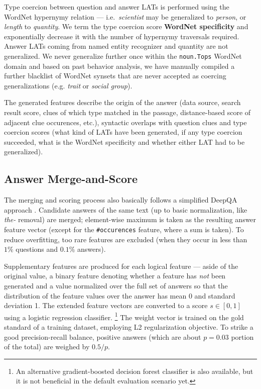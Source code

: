 Type coercion between question and answer LATs is performed using the WordNet
hypernymy relation --- i.e.\ \textit{scientist} may be generalized to \textit{person}, or \textit{length} to \textit{quantity}.
We term the type coercion score \textbf{WordNet specificity} and exponentially decrease it
with the number of hypernymy traversals required.
Answer LATs coming from named entity recognizer and quantity are not generalized.
We never generalize further once within the \texttt{noun.Tops} WordNet domain and
based on past behavior analysis, we have manually compiled a further blacklist
of WordNet synsets that are never accepted as coercing generalizations
(e.g. \textit{trait} or \textit{social group}).

The generated features describe the origin of the answer (data source, search result score, clues of which type matched in the passage, distance-based score of adjacent clue occurences, etc.), syntactic overlaps with question clues and type coercion scores (what kind of LATs have been generated, if any type coercion succeeded, what is the WordNet specificity and whether either LAT had to be generalized).

\subsection{Answer Merge-and-Score}

The merging and scoring process also basically follows a simplified DeepQA approach \citep{WatsonScoring}.
Candidate answers of the same text (up to basic normalization, like \textit{the-} removal) are merged;
element-wise maximum is taken as the resulting answer feature vector
(except for the \texttt{\#occurences} feature, where a sum is taken).
To reduce overfitting, too rare features are excluded
(when they occur in less than $1\%$ questions and $0.1\%$ answers).

Supplementary features are produced for each logical feature --- aside of the original value,
a binary feature denoting whether a feature has \textit{not} been generated
and a value normalized over the full set of answers
so that the distribution of the feature values over the answer
has mean 0 and standard deviation 1.
The extended feature vectors are converted to a score $s \in [0,1]$
using a logistic regression classifier.%
\footnote{An alternative gradient-boosted decision forest classifier is also
	available, but it is not beneficial in the default evaluation scenario yet.}
The weight vector is trained on the gold standard of a training dataset,
employing L2 regularization objective.  To strike a good precision-recall
balance, positive answers (which are about $p=0.03$ portion of the total)
are weighed by $0.5/p$.

